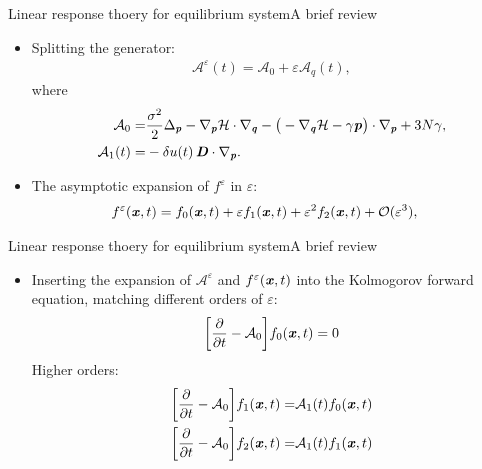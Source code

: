 \documentclass[fleqn]{beamer}
\newcommand{\bluec}[1]{{\color{blue} #1}}
\newcommand{\vect}[1]{\textbf{\textit{#1}}}
\newcommand{\fe}{u}
\newcommand{\mh}{\mathcal H}
\newcommand{\eps}{\varepsilon}
\newcommand{\mo}{\mathcal O}
\newcommand{\fwg}{{\mathcal A}}
\begin{document}
\begin{frame}{Linear response thoery for equilibrium system}{A brief review}
  \begin{itemize}
  \item <1-> Splitting the generator:
    \bluec{
      \begin{align*}
        \fwg^\eps(t) = \fwg_0 + \eps\fwg_q(t),
      \end{align*}
    }
    where
    \bluec{
      \begin{align*}
        \fwg_0 =&
        \frac{\sigma^2}2\Delta_{\vect p}
        -
        \nabla_{\vect p}\mh\cdot\nabla_{\vect q}
        - \big(
        -\nabla_{\vect q}\mh - \gamma\vect p
        \big)\cdot\nabla_{\vect p}
        + 3N\gamma,\\
        \fwg_1(t) =&
        - \delta\fe(t) \, \vect D \cdot\nabla_{\vect p}.        
      \end{align*}
    }
  \item <2-> The asymptotic expansion of \bluec{$f^\eps$} in \bluec{$\eps$}:
    \bluec{
      \begin{align*}
        f^\eps(\vect x, t) &= f_0(\vect x, t) + \eps f_1(\vect x, t)
        +\eps^2 f_2(\vect x, t) + \mo (\eps^3),        
      \end{align*}
    }
  \end{itemize}
\end{frame}


\begin{frame}{Linear response thoery for equilibrium system}{A brief review}
  \begin{itemize}
  \item <1-> Inserting the expansion of
    \bluec{$\fwg^\eps$} and \bluec{$f^\eps(\vect x, t)$} into the
    Kolmogorov forward equation, matching different orders of \bluec{$\eps$}:
    \bluec{
      \begin{align*}
        \bigg[ \frac{\partial}{\partial t} - \fwg_0 \bigg]
        f_0(\vect x, t) = 0
      \end{align*}
    }
    Higher orders:
    \bluec{
      \begin{align*}
        \bigg[
        \frac{\partial}{\partial t}
        - \fwg_0
        \bigg]
        f_1(\vect x, t)
        =&
        \fwg_1(t) f_0(\vect x, t)\\\label{eqn:e-o2}
        \bigg[
        \frac{\partial}{\partial t}
        - \fwg_0
        \bigg]
        f_2(\vect x, t)
        =&
        \fwg_1(t) f_1(\vect x, t)        
      \end{align*}
    }
  \end{itemize}
\end{frame}
\end{document}
